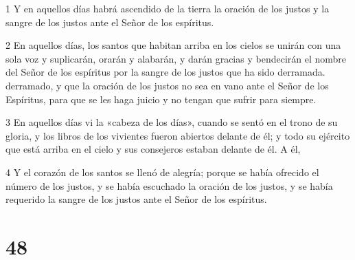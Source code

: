 \par 1 Y en aquellos días habrá ascendido de la tierra la oración de los justos y la sangre de los justos ante el Señor de los espíritus.
\par 2 En aquellos días, los santos que habitan arriba en los cielos se unirán con una sola voz y suplicarán, orarán y alabarán, y darán gracias y bendecirán el nombre del Señor de los espíritus por la sangre de los justos que ha sido derramada. derramado, y que la oración de los justos no sea en vano ante el Señor de los Espíritus, para que se les haga juicio y no tengan que sufrir para siempre.
\par 3 En aquellos días vi la «cabeza de los días», cuando se sentó en el trono de su gloria, y los libros de los vivientes fueron abiertos delante de él; y todo su ejército que está arriba en el cielo y sus consejeros estaban delante de él. A él,
\par 4 Y el corazón de los santos se llenó de alegría; porque se había ofrecido el número de los justos, y se había escuchado la oración de los justos, y se había requerido la sangre de los justos ante el Señor de los espíritus.

\chapter{48}

